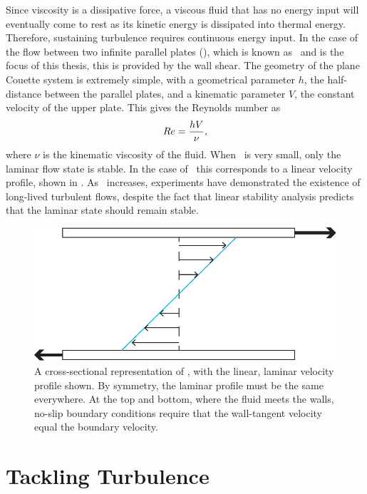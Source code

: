 Since viscosity is a dissipative force, a viscous fluid that has no energy input will eventually come to rest as its kinetic energy is dissipated into thermal energy. Therefore, sustaining turbulence requires continuous energy input. In the case of the flow between two infinite parallel plates (), which is known as \pCf\ and is the focus of this thesis, this is provided by the wall shear. The geometry of the plane Couette system is extremely simple, with a geometrical parameter $h$, the half-distance between the parallel plates, and a kinematic parameter $V$, the constant velocity of the upper plate. This gives the Reynolds number as 
\begin{equation}
Re = \dfrac{hV}{\nu},
\end{equation}
where $\nu$ is the kinematic viscosity of the fluid. When \ReN~is very small, only the laminar flow state is stable. In the case of \pCf\ this corresponds to a linear velocity profile, shown in . As \ReN~increases, experiments have demonstrated the existence of long-lived turbulent flows, despite the fact that linear stability analysis predicts that the laminar state should remain stable.
\begin{figure}
\centerline{
\includegraphics[scale=0.6]{Figs/planeCouetteMeanFlow}}
\caption[A cross-sectional representation of \pCf, with the linear, laminar velocity profile shown.]{A cross-sectional representation of \pCf, with the linear, laminar velocity profile shown. By symmetry, the laminar profile must be the same everywhere. At the top and bottom, where the fluid meets the walls, no-slip boundary conditions require that the wall-tangent velocity equal the boundary velocity.}\label{fig:planeCouetteBulk}
\end{figure}

\section{Tackling Turbulence} 

